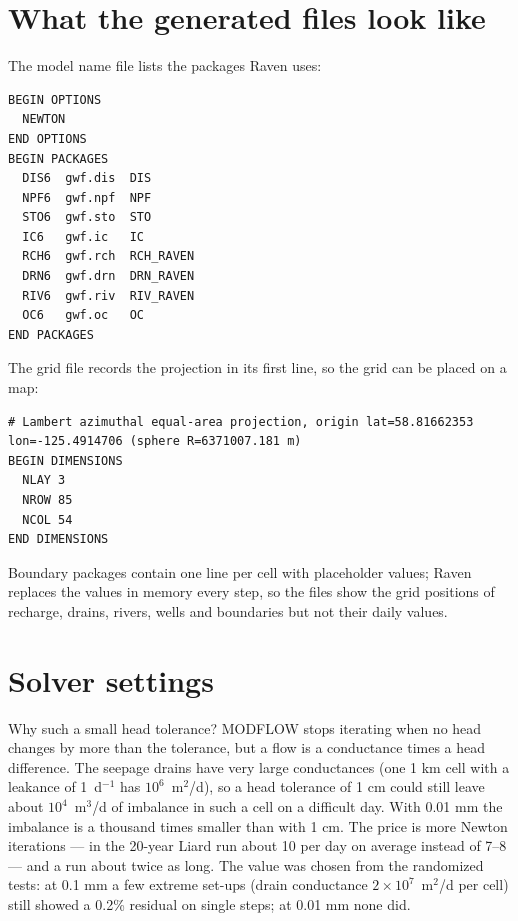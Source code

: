 \section{What the generated files look like}
The model name file lists the packages Raven uses:
\begin{lstlisting}
BEGIN OPTIONS
  NEWTON
END OPTIONS
BEGIN PACKAGES
  DIS6  gwf.dis  DIS
  NPF6  gwf.npf  NPF
  STO6  gwf.sto  STO
  IC6   gwf.ic   IC
  RCH6  gwf.rch  RCH_RAVEN
  DRN6  gwf.drn  DRN_RAVEN
  RIV6  gwf.riv  RIV_RAVEN
  OC6   gwf.oc   OC
END PACKAGES
\end{lstlisting}
The grid file records the projection in its first line, so the grid can be placed on a map:
\par\noindent\begin{minipage}{\linewidth}
\begin{lstlisting}
# Lambert azimuthal equal-area projection, origin lat=58.81662353 lon=-125.4914706 (sphere R=6371007.181 m)
BEGIN DIMENSIONS
  NLAY 3
  NROW 85
  NCOL 54
END DIMENSIONS
\end{lstlisting}
\end{minipage}\par\smallskip
Boundary packages contain one line per cell with placeholder values; Raven replaces the values in memory every step, so
the files show the grid positions of recharge, drains, rivers, wells and boundaries but not their daily values.

\section{Solver settings}
Why such a small head tolerance? MODFLOW stops iterating when no head changes by more than the tolerance, but a flow is a
conductance times a head difference. The seepage drains have very large conductances (one 1 km cell with a leakance of
1~d$^{-1}$ has $10^6$~m$^2$/d), so a head tolerance of 1 cm could still leave about $10^4$~m$^3$/d of imbalance in such a cell on a
difficult day. With 0.01 mm the imbalance is a thousand times smaller than with 1 cm. The price is more Newton iterations --- in the
20-year Liard run about 10 per day on average instead of 7--8 --- and a run about twice as long. The value was chosen from the
randomized tests: at 0.1 mm a few extreme set-ups (drain conductance $2\times10^7$~m$^2$/d per cell) still showed a 0.2\%
residual on single steps; at 0.01 mm none did.

